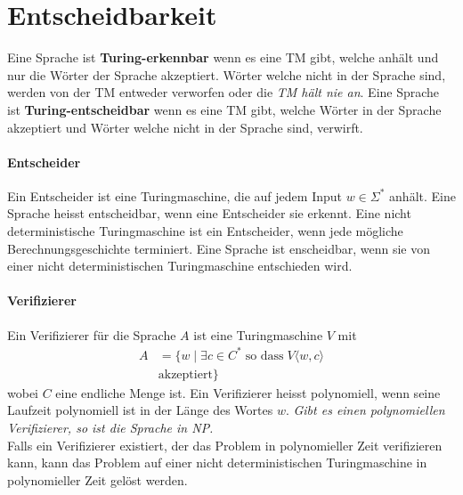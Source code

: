 \section*{Entscheidbarkeit}
Eine Sprache ist \textbf{Turing-erkennbar} wenn es eine TM gibt, welche anhält und nur die Wörter der Sprache akzeptiert. Wörter welche nicht in der Sprache sind, werden von der TM entweder verworfen oder die \textit{TM hält nie an}. \newline
Eine Sprache ist \textbf{Turing-entscheidbar} wenn es eine TM gibt, welche Wörter in der Sprache akzeptiert und Wörter welche nicht in der Sprache sind, verwirft.
\paragraph{Entscheider} Ein Entscheider ist eine Turingmaschine, die auf jedem Input \(w \in \Sigma^*\) anhält. Eine Sprache heisst entscheidbar, wenn eine Entscheider sie erkennt. \newline
Eine nicht deterministische Turingmaschine ist ein Entscheider, wenn jede mögliche Berechnungsgeschichte terminiert. Eine Sprache ist enscheidbar, wenn sie von einer nicht deterministischen Turingmaschine entschieden wird.
\paragraph{Verifizierer} Ein Verifizierer für die Sprache \(A\) ist eine Turingmaschine \(V\) mit 
\begin{align*}
    A &= \{w \mid \exists c \in C^* \;\text{so dass}\; V\langle w,c \rangle \\ 
    &\text{akzeptiert}\}
\end{align*}
wobei \(C\) eine endliche Menge ist. Ein Verifizierer heisst polynomiell, wenn seine Laufzeit polynomiell ist in der Länge des Wortes \(w\). \textit{Gibt es einen polynomiellen Verifizierer, so ist die Sprache in NP.
}\\
Falls ein Verifizierer existiert, der das Problem in polynomieller Zeit verifizieren kann, kann das Problem auf einer nicht deterministischen Turingmaschine in polynomieller Zeit gelöst werden.
